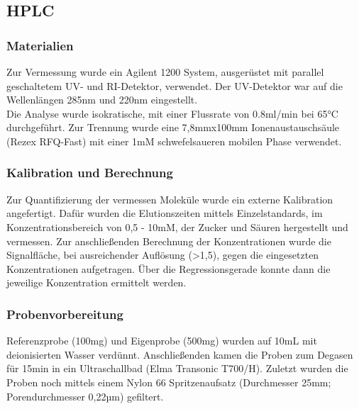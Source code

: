\newpage
\subsection{HPLC}
\subsubsection{Materialien}
Zur Vermessung wurde ein Agilent 1200 System, ausgerüstet mit parallel geschaltetem UV- und RI-Detektor, verwendet. Der UV-Detektor war auf die Wellenlängen 285nm und 220nm eingestellt. \\
Die Analyse wurde isokratische, mit einer Flussrate von 0.8ml/min bei 65°C durchgeführt. Zur Trennung wurde eine 7,8mmx100mm Ionenaustauschsäule (Rezex RFQ-Fast) mit einer 1mM schwefelsaueren mobilen Phase verwendet. 

\subsubsection{Kalibration und Berechnung}
Zur Quantifizierung der vermessen Moleküle wurde ein externe Kalibration angefertigt. Dafür wurden die Elutionszeiten mittels Einzelstandards, im Konzentrationsbereich von 0,5 - 10mM, der Zucker und Säuren hergestellt und vermessen. Zur anschließenden Berechnung der Konzentrationen wurde die Signalfläche, bei ausreichender Auflösung (>1,5), gegen die eingesetzten Konzentrationen aufgetragen. Über die Regressionsgerade konnte dann die jeweilige Konzentration ermittelt werden. 

\subsubsection{Probenvorbereitung}
Referenzprobe (100mg) und  Eigenprobe (500mg) wurden auf 10mL mit deionisierten Wasser verdünnt. Anschließenden kamen die Proben zum Degasen für 15min in ein Ultraschallbad (Elma Transonic T700/H). Zuletzt wurden die Proben noch mittels einem Nylon 66 Spritzenaufsatz (Durchmesser 25mm; Porendurchmesser 0,22µm) gefiltert. 

